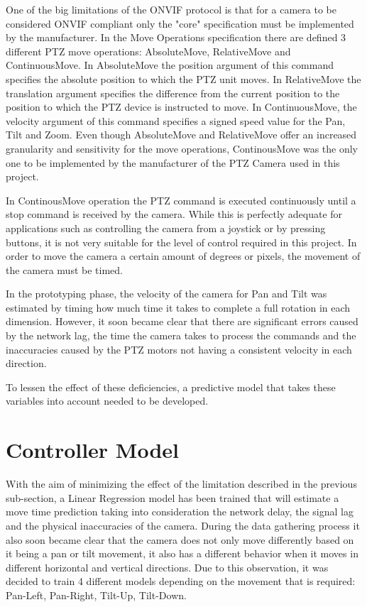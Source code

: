 \documentclass{l4proj}
\begin{document}
One of the big limitations of the ONVIF protocol is that for a camera to be considered ONVIF compliant only the "core" specification must be implemented by the manufacturer. In the Move Operations specification there are defined 3 different PTZ move operations: AbsoluteMove, RelativeMove and ContinuousMove. In AbsoluteMove the position argument of this command specifies the absolute position to which the PTZ unit moves. In RelativeMove the translation argument specifies the difference from the current position to the position to which the PTZ device is instructed to move. In ContinuousMove, the velocity argument of this command specifies a signed speed value for the Pan, Tilt and Zoom.  Even though AbsoluteMove and RelativeMove offer an increased granularity and sensitivity for the move operations,  ContinousMove was the only one to be implemented by the manufacturer of the PTZ Camera used in this project. 

In ContinousMove operation the PTZ command is executed continuously until a stop command is received by the camera. While this is perfectly adequate for applications such as controlling the camera from a joystick or by pressing buttons, it is not very suitable for the level of control required in this project. In order to move the camera a certain amount of degrees or pixels, the movement of the camera must be timed. 

In the prototyping phase, the velocity of the camera for Pan and Tilt was estimated by timing how much time it takes to complete a full rotation in each dimension. However, it soon became clear that there are significant errors caused by the network lag, the time the camera takes to process the commands and the inaccuracies caused by the PTZ motors not having a consistent velocity in each direction. 

To lessen the effect of these deficiencies, a predictive model that takes these variables into account needed to be developed.

\section{Controller Model}

With the aim of minimizing the effect of the limitation described in the previous sub-section, a Linear Regression model has been trained that will estimate a move time prediction taking into consideration the network delay, the signal lag and the physical inaccuracies of the camera. During the data gathering process it also soon became clear that the camera does not only move differently based on it being a pan or tilt movement, it also has a different behavior when it moves in different horizontal and vertical directions. Due to this observation, it was decided to train 4 different models depending on the movement that is required: Pan-Left, Pan-Right, Tilt-Up, Tilt-Down.  
\end{document}
